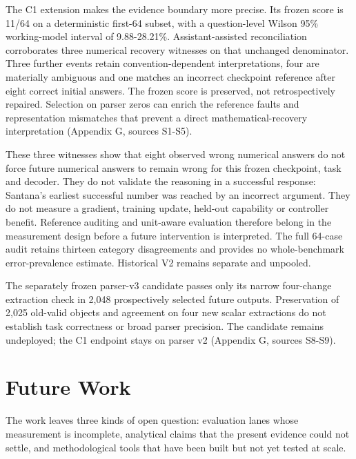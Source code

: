 \documentclass[12pt,a4paper]{report}
\begin{document}
The C1 extension makes the evidence boundary more precise. Its frozen
score is 11/64 on a deterministic first-64 subset, with a question-level
Wilson 95\% working-model interval of 9.88-28.21\%. Assistant-assisted
reconciliation corroborates three numerical recovery witnesses on that
unchanged denominator. Three further events retain convention-dependent
interpretations, four are materially ambiguous and one matches an
incorrect checkpoint reference after eight correct initial answers. The
frozen score is preserved, not retrospectively repaired. Selection on
parser zeros can enrich the reference faults and representation
mismatches that prevent a direct mathematical-recovery interpretation
(Appendix G, sources S1-S5).

These three witnesses show that eight observed wrong numerical answers
do not force future numerical answers to remain wrong for this frozen
checkpoint, task and decoder. They do not validate the reasoning in a
successful response: Santana's earliest successful number was reached by
an incorrect argument. They do not measure a gradient, training update,
held-out capability or controller benefit. Reference auditing and
unit-aware evaluation therefore belong in the measurement design before
a future intervention is interpreted. The full 64-case audit retains
thirteen category disagreements and provides no whole-benchmark
error-prevalence estimate. Historical V2 remains separate and unpooled.

The separately frozen parser-v3 candidate passes only its narrow
four-change extraction check in 2,048 prospectively selected future
outputs. Preservation of 2,025 old-valid objects and agreement on four
new scalar extractions do not establish task correctness or broad parser
precision. The candidate remains undeployed; the C1 endpoint stays on
parser v2 (Appendix G, sources S8-S9).

\section{Future Work}\label{future-work}

The work leaves three kinds of open question: evaluation lanes whose
measurement is incomplete, analytical claims that the present evidence
could not settle, and methodological tools that have been built but not
yet tested at scale.
\end{document}
